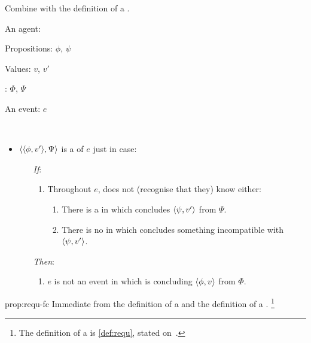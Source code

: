 \begin{note}
  Combine with the definition of a \fc{}.

  \begin{proposition}
    \label{prop:requ-fc}
    \begin{itemize*}[noitemsep, label=\(\circ\)]
    \item
      An agent: \vAgent{}
    \item
      Propositions: \(\phi\), \(\psi\)
    \item
      Values: \(v\), \(v'\)
    \item
      : \(\Phi\), \(\Psi\)
    \item
      An event: \(e\)
    \item
      \mbox{ }
    \end{itemize*}

    \begin{itemize}
    \item
      \(\langle \langle \phi, v' \rangle, \Psi \rangle\) is a \emph{\requ{}} of \(e\) just in case:
      \begin{itemize}
      \item[\emph{If}:]
        \begin{enumerate}[label=\alph*., ref=(\alph*), series=requDefSeries]
        \item
          \label{prop:requ-fc:nk}
          Throughout \(e\), \vAgent{} does not (recognise that they) know either:
          \begin{enumerate}[label=\roman*., ref=(\roman*)]
          \item
            \label{prop:requ-fc:nk:psi}
            There is a \pevent{} in which \vAgent{} concludes \(\langle \psi, v' \rangle\) from \(\Psi\).
          \item
            \label{prop:requ-fc:nk:no-conf}
            There is no \pevent{} in which \vAgent{} concludes something incompatible with \(\langle \psi, v' \rangle\).
          \end{enumerate}
        \end{enumerate}
      \item[\emph{Then}:]
        \begin{enumerate}[label=\alph*., ref=(\alph*), resume*=requDefSeries]
        \item
          \label{prop:requ-fc:ne}
          \(e\) is not an event in which \vAgent{} is concluding \(\langle \phi, v \rangle\) from \(\Phi\).
        \end{enumerate}
      \end{itemize}
    \end{itemize}
    \vspace{-\baselineskip}
  \end{proposition}

  \begin{argument}{prop:requ-fc}
    Immediate from the definition of a \requ{} and the definition of a \fc{}.%
    \footnote{
      The definition of a \fc{} is \autoref{def:requ}, stated on~.
    }
  \end{argument}
\end{note}

